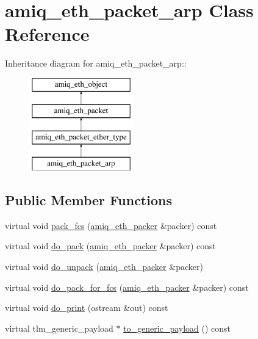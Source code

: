 \hypertarget{classamiq__eth__packet__arp}{
\section{amiq\_\-eth\_\-packet\_\-arp Class Reference}
\label{classamiq__eth__packet__arp}
}
Inheritance diagram for amiq\_\-eth\_\-packet\_\-arp::\begin{figure}[H]
\begin{center}
\leavevmode
\includegraphics[height=4cm]{classamiq__eth__packet__arp}
\end{center}
\end{figure}
\subsection*{Public Member Functions}
\begin{DoxyCompactItemize}
\item 
virtual void \hyperlink{classamiq__eth__packet__arp_acfbc5406f0f914c2cae4a69c3aac1efd}{pack\_\-fcs} (\hyperlink{classamiq__eth__packer}{amiq\_\-eth\_\-packer} \&packer) const 
\item 
virtual void \hyperlink{classamiq__eth__packet__arp_aa0919231910bf804ffafd9b1b771785f}{do\_\-pack} (\hyperlink{classamiq__eth__packer}{amiq\_\-eth\_\-packer} \&packer) const 
\item 
virtual void \hyperlink{classamiq__eth__packet__arp_afa8463360e8e62b24e1171093b00a798}{do\_\-unpack} (\hyperlink{classamiq__eth__packer}{amiq\_\-eth\_\-packer} \&packer)
\item 
virtual void \hyperlink{classamiq__eth__packet__arp_aa94e012455f436aa874eb6e27e02b5fa}{do\_\-pack\_\-for\_\-fcs} (\hyperlink{classamiq__eth__packer}{amiq\_\-eth\_\-packer} \&packer) const 
\item 
virtual void \hyperlink{classamiq__eth__packet__arp_abbb862d7b7abe9b1c6d49455f80f6921}{do\_\-print} (ostream \&out) const 
\item 
virtual tlm\_\-generic\_\-payload $\ast$ \hyperlink{classamiq__eth__packet__arp_a24f433f25d4cec2799e58a836c1411f0}{to\_\-generic\_\-payload} () const 
\end{DoxyCompactItemize}
